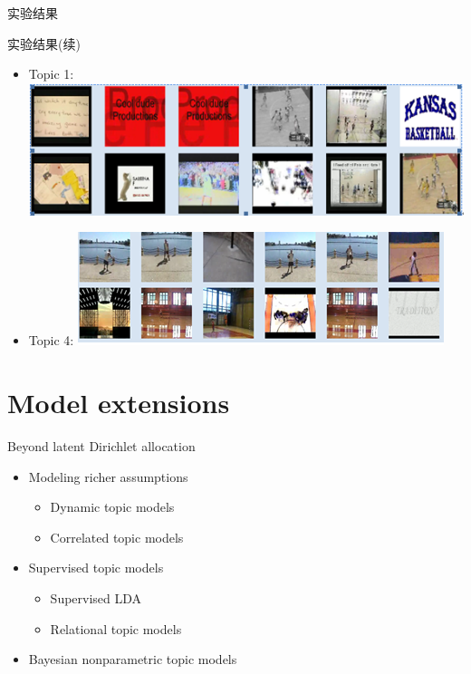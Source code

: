 \documentclass[hyperref={unicode}]{beamer}
\begin{document}
\begin{CJK}{UTF8}{gkai}
\begin{frame}{实验结果}
\end{frame}
\begin{frame}{实验结果(续)}
  \begin{itemize}
  \item  Topic 1: \includegraphics[scale=0.6]{topic1}
  \item Topic 4:   \includegraphics[scale=0.8]{topic4}
  \end{itemize}

\end{frame}
\section{Model extensions}
\begin{frame}{Beyond latent Dirichlet allocation}
  \begin{itemize}
  \item Modeling richer assumptions
    \begin{itemize}
      \item Dynamic topic models
      \item Correlated topic models
    \end{itemize}
  \item Supervised topic models
\begin{itemize}
\item Supervised LDA
\item Relational topic models
\end{itemize}

  \item Bayesian nonparametric topic models
  \end{itemize}

\end{frame}


\end{CJK}
\end{document}
